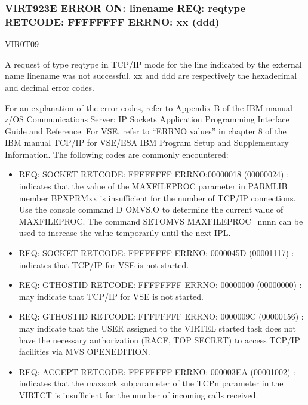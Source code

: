 \documentclass[letterpaper,10pt,english]{sphinxmanual}
\begin{document}
\subsubsection{VIRT923E ERROR ON: linename REQ: reqtype \sphinxhyphen{} RETCODE: FFFFFFFF ERRNO: xx (ddd)}
\label{\detokenize{messages:virt923e-error-on-linename-req-reqtype-retcode-ffffffff-errno-xx-ddd}}\begin{description}
\sphinxAtStartPar
VIR0T09

\sphinxAtStartPar
A request of type reqtype in TCP/IP mode for the line indicated by the external name linename was not successful. xx and ddd are respectively the hexadecimal and decimal error codes.

\sphinxAtStartPar
For an explanation of the error codes, refer to Appendix B of the IBM manual z/OS Communications Server: IP Sockets Application Programming Interface Guide and Reference. For VSE, refer to “ERRNO values” in chapter 8 of the IBM manual TCP/IP for VSE/ESA IBM Program Setup and Supplementary Information.
The following codes are commonly encountered:
\begin{itemize}
\item {} 
\sphinxAtStartPar
REQ: SOCKET \sphinxhyphen{} RETCODE: FFFFFFFF ERRNO:00000018 (00000024) : indicates that the value of the MAXFILEPROC parameter in PARMLIB member BPXPRMxx is insufficient for the number of TCP/IP connections. Use the console command D OMVS,O to determine the current value of MAXFILEPROC. The command SETOMVS MAXFILEPROC=nnnn can be used to increase the value temporarily until the next IPL.

\item {} 
\sphinxAtStartPar
REQ: SOCKET \sphinxhyphen{} RETCODE: FFFFFFFF ERRNO: 0000045D (00001117) : indicates that TCP/IP for VSE is not started.

\item {} 
\sphinxAtStartPar
REQ: GTHOSTID \sphinxhyphen{} RETCODE: FFFFFFFF ERRNO: 00000000 (00000000) : may indicate that TCP/IP for VSE is not started.

\item {} 
\sphinxAtStartPar
REQ: GTHOSTID \sphinxhyphen{} RETCODE: FFFFFFFF ERRNO: 0000009C (00000156) : may indicate that the USER assigned to the VIRTEL started task does not have the necessary authorization (RACF, TOP SECRET) to access TCP/IP facilities via MVS OPEN\sphinxhyphen{}EDITION.

\item {} 
\sphinxAtStartPar
REQ: ACCEPT \sphinxhyphen{} RETCODE: FFFFFFFF ERRNO: 000003EA (00001002) : indicates that the maxsock subparameter of the TCPn parameter in the VIRTCT is insufficient for the number of incoming calls received.


\end{itemize}
\end{description}
\end{document}
